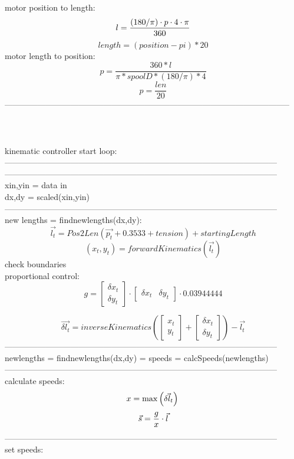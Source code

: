 \documentclass{article}
\begin{document}
motor position to length: 
\[
l = \frac{(180/\pi)\cdot p \cdot 4 \cdot \pi }{360}\\
\]
\[
length = (position-pi)*20
\]
motor length to position: 
\[
p = \frac{360*l}{\pi*spoolD*(180/\pi)*4}
\]
\[
p = \frac{len}{20}
\]
--------------------------------------------------------------------------------------------------------\\
\\
\\
\\
\newpage
kinematic controller start loop:\\
---------------------------------------------------------------------------------------------------
---------------------------------------------------------------------------------------------------\\
xin,yin = data in\\
dx,dy = scaled(xin,yin)\\
---------------------------------------------------------------------------------------------------\\
new lengths = findnewlengths(dx,dy):
	\[
	\vec{l_t} = Pos2Len
	\left(
	\vec{p_t} + 0.3533 + tension
	\right) + startingLength
	\]
	\[
	(x_t,y_t) = forwardKinematics \left(
	\vec{l_t}
	\right)
	\]
\quad	check boundaries\\
\quad	proportional control:
 \[
	g = 
	\begin{bmatrix}
	\delta{x_t}\\
	\delta{y_t}
	\end{bmatrix}
	\cdot
	\begin{bmatrix}
	\delta{x_t} & \delta{y_t}
	\end{bmatrix}
	\cdot 
	0.03944444
	\]
	
	
	\[
	\vec{\delta{l_t}} = inverseKinematics \left(
	\begin{bmatrix}
	x_t\\
	y_t
	\end{bmatrix}
	+ 
	\begin{bmatrix}
	\delta{x_t}\\
	\delta{y_t}
	\end{bmatrix}
	\right)
	- \vec{l_t}
	\]
	---------------------------------------------------------------------------------------------------\\
	newlengths = findnewlengths(dx,dy) = 
	speeds = calcSpeeds(newlengths)
	---------------------------------------------------------------------------------------------------\\
	calculate speeds:
\[
	x = \max\left(\vec{\delta{l_t}}\right)\\\\
	\]\[
	\vec{s} = \frac{g}{x}\cdot \vec{l}\\	
\]
---------------------------------------------------------------------------------------------------\\
	set speeds:\\
	
\end{document}
